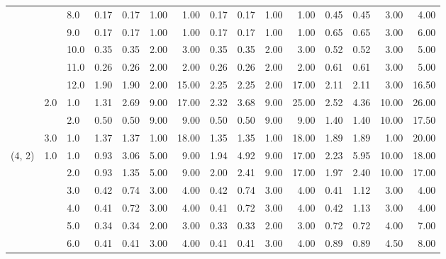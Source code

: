 \begin{tabular}{lllrrrrrrrrrrrr}
       &     & 8.0  &       0.17 &      0.17 & 1.00 &   1.00 &       0.17 &      0.17 &  1.00 &   1.00 &       0.45 &      0.45 &  3.00 &   4.00 \\
       &     & 9.0  &       0.17 &      0.17 & 1.00 &   1.00 &       0.17 &      0.17 &  1.00 &   1.00 &       0.65 &      0.65 &  3.00 &   6.00 \\
       &     & 10.0 &       0.35 &      0.35 & 2.00 &   3.00 &       0.35 &      0.35 &  2.00 &   3.00 &       0.52 &      0.52 &  3.00 &   5.00 \\
       &     & 11.0 &       0.26 &      0.26 & 2.00 &   2.00 &       0.26 &      0.26 &  2.00 &   2.00 &       0.61 &      0.61 &  3.00 &   5.00 \\
       &     & 12.0 &       1.90 &      1.90 & 2.00 &  15.00 &       2.25 &      2.25 &  2.00 &  17.00 &       2.11 &      2.11 &  3.00 &  16.50 \\
       & 2.0 & 1.0  &       1.31 &      2.69 & 9.00 &  17.00 &       2.32 &      3.68 &  9.00 &  25.00 &       2.52 &      4.36 & 10.00 &  26.00 \\
       &     & 2.0  &       0.50 &      0.50 & 9.00 &   9.00 &       0.50 &      0.50 &  9.00 &   9.00 &       1.40 &      1.40 & 10.00 &  17.50 \\
       & 3.0 & 1.0  &       1.37 &      1.37 & 1.00 &  18.00 &       1.35 &      1.35 &  1.00 &  18.00 &       1.89 &      1.89 &  1.00 &  20.00 \\
(4, 2) & 1.0 & 1.0  &       0.93 &      3.06 & 5.00 &   9.00 &       1.94 &      4.92 &  9.00 &  17.00 &       2.23 &      5.95 & 10.00 &  18.00 \\
       &     & 2.0  &       0.93 &      1.35 & 5.00 &   9.00 &       2.00 &      2.41 &  9.00 &  17.00 &       1.97 &      2.40 & 10.00 &  17.00 \\
       &     & 3.0  &       0.42 &      0.74 & 3.00 &   4.00 &       0.42 &      0.74 &  3.00 &   4.00 &       0.41 &      1.12 &  3.00 &   4.00 \\
       &     & 4.0  &       0.41 &      0.72 & 3.00 &   4.00 &       0.41 &      0.72 &  3.00 &   4.00 &       0.42 &      1.13 &  3.00 &   4.00 \\
       &     & 5.0  &       0.34 &      0.34 & 2.00 &   3.00 &       0.33 &      0.33 &  2.00 &   3.00 &       0.72 &      0.72 &  4.00 &   7.00 \\
       &     & 6.0  &       0.41 &      0.41 & 3.00 &   4.00 &       0.41 &      0.41 &  3.00 &   4.00 &       0.89 &      0.89 &  4.50 &   8.00 \\

\end{tabular}
